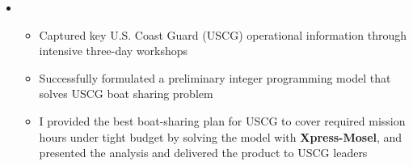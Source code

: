 \documentclass[11pt,a4paper,sans]{moderncv}        %
\begin{document}
\begin{itemize}
	\item{
		{\vspace{3pt}
			\begin{itemize}
				\item Captured key U.S. Coast Guard (USCG) operational information through intensive three-day workshops
				\item Successfully formulated a preliminary integer programming model that solves USCG boat sharing problem
				\item I provided the best boat-sharing plan for USCG to cover required mission hours under tight budget by solving the model with \textbf{Xpress-Mosel}, and presented the analysis and delivered the product to USCG leaders %
			\end{itemize}}}

	\vspace{4pt}


\end{itemize}
\end{document}
